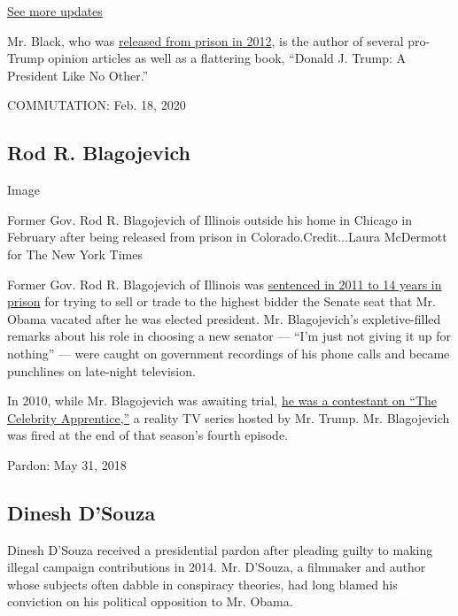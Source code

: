 \href{https://www.nytimes.com/2020/07/31/us/elections/biden-vs-trump.html?action=click\&pgtype=Article\&state=default\&region=MAIN_CONTENT_1\&context=storylines_live_updates}{See
more updates}

Mr. Black, who was
\href{https://dealbook.nytimes.com/2012/05/04/conrad-black-is-freed/}{released
from prison in 2012}, is the author of several pro-Trump opinion
articles as well as a flattering book, ``Donald J. Trump: A President
Like No Other.''

COMMUTATION: Feb. 18, 2020

\hypertarget{rod-r-blagojevich}{%
\subsection{Rod R. Blagojevich}\label{rod-r-blagojevich}}

Image

Former Gov. Rod R. Blagojevich of Illinois outside his home in Chicago
in February after being released from prison in Colorado.Credit...Laura
McDermott for The New York Times

Former Gov. Rod R. Blagojevich of Illinois was
\href{https://www.nytimes.com/2011/12/08/us/blagojevich-expresses-remorse-in-courtroom-speech.html}{sentenced
in 2011 to 14 years in prison} for trying to sell or trade to the
highest bidder the Senate seat that Mr. Obama vacated after he was
elected president. Mr. Blagojevich's expletive-filled remarks about his
role in choosing a new senator --- ``I'm just not giving it up for
nothing'' --- were caught on government recordings of his phone calls
and became punchlines on late-night television.

In 2010, while Mr. Blagojevich was awaiting trial,
\href{https://www.washingtonpost.com/history/2019/08/11/that-time-trump-fired-rod-blagojevich-celebrity-apprentice-harry-potter-incompetence/}{he
was a contestant on ``The Celebrity Apprentice,''} a reality TV series
hosted by Mr. Trump. Mr. Blagojevich was fired at the end of that
season's fourth episode.

Pardon: May 31, 2018

\hypertarget{dinesh-dsouza}{%
\subsection{Dinesh D'Souza}\label{dinesh-dsouza}}

Dinesh D'Souza received a presidential pardon after pleading guilty to
making illegal campaign contributions in 2014. Mr. D'Souza, a filmmaker
and author whose subjects often dabble in conspiracy theories, had long
blamed his conviction on his political opposition to Mr. Obama.


